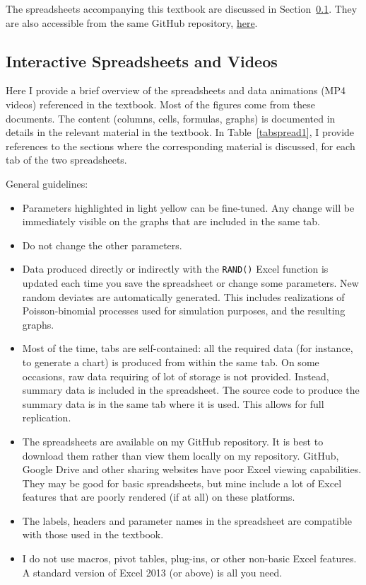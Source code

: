 \documentclass[10pt]{article}
\begin{document}
The spreadsheets accompanying this textbook are discussed in Section~\ref{spr}. They are also accessible from the same GitHub repository,
\href{https://github.com/VincentGranville/Point-Processes/tree/main/Spreadsheets}{here}.

\subsection{Interactive Spreadsheets and Videos}\label{spr}

Here I provide a brief overview of the spreadsheets and data animations (MP4 videos) referenced in the textbook. Most of the figures come from these documents.
The content (columns, cells, formulas, graphs) is documented in details in the relevant material in the textbook.
In Table~\ref{tabspread1}, I provide references to the sections where the corresponding material is discussed, for each tab of the two spreadsheets. %

\noindent  General guidelines:
\nopagebreak \begin{itemize}
\item Parameters highlighted in light yellow can be fine-tuned. Any change will be immediately visible on the graphs that are included in the same tab.
\item Do not change the other parameters.
\item Data produced directly or indirectly with the \texttt{RAND()} Excel function is updated each time you save the spreadsheet or change some parameters. New random deviates are automatically generated. This includes realizations of Poisson-binomial processes used for simulation purposes, and the resulting graphs.
\item Most of the time, tabs are self-contained: all the required data (for instance, to generate a chart) is produced from within the same tab. On some occasions, raw data requiring of lot of storage is not provided.
Instead, summary data is included in the spreadsheet. The source code to produce the summary data  is in the same tab where it is used. This allows for full
 replication.
\item The spreadsheets are available on my GitHub repository. It is best to download them rather than view them locally on my repository. GitHub, Google Drive and other sharing websites have poor Excel viewing capabilities. They may be good for basic spreadsheets, but mine include a lot of Excel features that are poorly rendered (if at all) on these platforms.
\item The labels, headers and parameter names in the spreadsheet are compatible with those used in the textbook.
\item I do not use macros, pivot tables, plug-ins, or other non-basic Excel features. A standard version of Excel 2013 (or above) is all you need.
\end{itemize}
\end{document}
